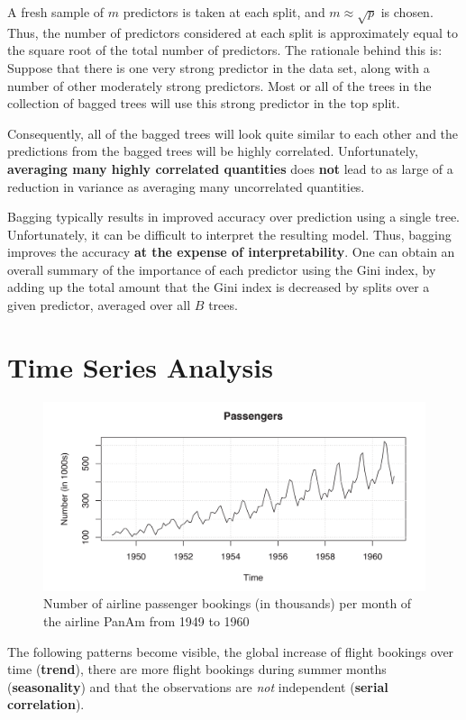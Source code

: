 \documentclass[11pt]{article}
\theoremstyle{definition}
\begin{document}
A fresh sample of $m$ predictors is taken at each split, and $m\approx \sqrt{p}$ is chosen. Thus, the number of predictors considered at each split is approximately equal to the square root of the total number of predictors. The rationale behind this is: Suppose that there is one very strong predictor in the data set, along with a number of other moderately strong predictors. Most or all of the trees in the collection of bagged trees will use this strong predictor in the top split. 

Consequently, all of the bagged trees will look quite similar to each other and the predictions from the bagged trees will be highly correlated. Unfortunately, \textbf{averaging many highly correlated quantities} does \textbf{not} lead to as large of a reduction in variance as averaging many uncorrelated quantities.

Bagging typically results in improved accuracy over prediction using a single tree. Unfortunately, it can be difficult to interpret the resulting model. Thus, bagging improves the accuracy \textbf{at the expense of interpretability}. One can obtain an overall summary of the importance of each predictor using the Gini index, by adding up the total amount that the Gini index is decreased by splits over a given predictor, averaged over all $B$ trees.

\section{Time Series Analysis}

\begin{figure}[H]
	\centering
	\includegraphics[width=0.7\linewidth]{img/time_series_plot}
	\caption{Number of airline passenger bookings (in thousands) per month of the airline PanAm from 1949 to 1960}
	\label{fig:timeseriesplot}
\end{figure}
The following patterns become visible, the global increase of flight bookings over time (\textbf{trend}), there are more flight bookings during summer months (\textbf{seasonality}) and that the observations are \emph{not} independent (\textbf{serial correlation}).
\end{document}
